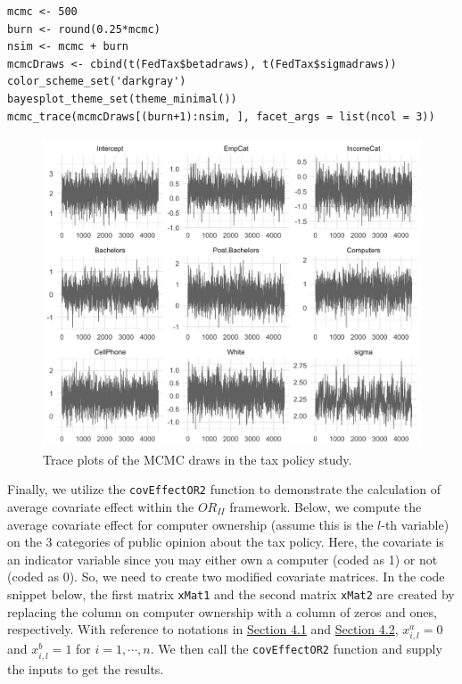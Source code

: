 \begin{verbatim}
mcmc <- 500
burn <- round(0.25*mcmc)
nsim <- mcmc + burn
mcmcDraws <- cbind(t(FedTax$betadraws), t(FedTax$sigmadraws))
color_scheme_set('darkgray')
bayesplot_theme_set(theme_minimal())
mcmc_trace(mcmcDraws[(burn+1):nsim, ], facet_args = list(ncol = 3))
\end{verbatim}

\begin{figure}

{\centering \includegraphics[width=1\linewidth,height=0.4\textheight]{TaxTracePlot} 

}

\caption{Trace plots of the MCMC draws in the tax policy study.}\label{fig:TaxTracePlot-tab-static}
\end{figure}

Finally, we utilize the \texttt{covEffectOR2} function to demonstrate the calculation of average covariate effect within the \(OR_{II}\) framework. Below, we compute the average covariate effect for computer ownership (assume this is the \(l\)-th variable) on the 3 categories of public opinion about the tax policy. Here, the covariate is an indicator variable since you may either own a computer (coded as 1) or not (coded as 0). So, we need to create two modified covariate matrices. In the code snippet below, the first matrix \texttt{xMat1} and the second matrix \texttt{xMat2} are created by replacing the column on computer ownership with a column of zeros and ones, respectively. With reference to notations in \protect\hyperlink{subsec:SimDataORII}{Section 4.1} and \protect\hyperlink{subsec:SimDataORII}{Section 4.2}, \(x_{i,l}^{a} = 0\) and \(x_{i,l}^{b} = 1\) for \(i=1,\cdots,n\). We then call the \texttt{covEffectOR2} function and supply the inputs to get the results.

